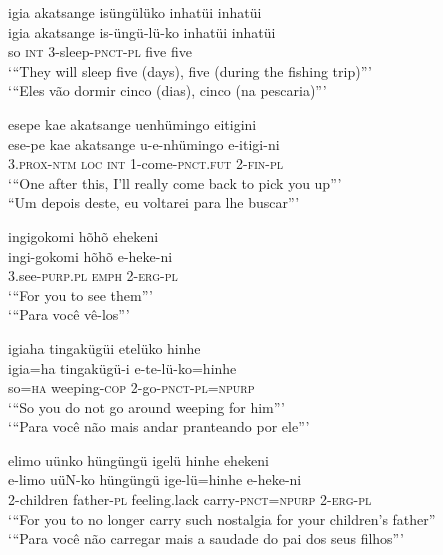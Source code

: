 \documentclass[output=paper,
modfonts,nonflat
]{langsci/langscibook}
\begin{document}
\ea igia akatsange isüngülüko inhatüi inhatüi \\[.3em]
\gll igia	akatsange	is-üngü-lü-ko		inhatüi	inhatüi \\
so	\textsc{int} 		3-sleep-\textsc{pnct-pl} 	five 		five \\
\glt ‘“They will sleep five (days), five (during the fishing trip)”’ \\
‘“Eles vão dormir cinco (dias), cinco (na pescaria)”’ \\
\z

\ea esepe kae akatsange uenhümingo eitigini \\[.3em]
\gll ese-pe		kae	akatsange	u-e-nhümingo		e-itigi-ni \\
3.\textsc{prox-ntm}	\textsc{loc} 	\textsc{int}		1-come-\textsc{pnct.fut} 	2-\textsc{fin-pl} \\
\glt ‘“One after this, I’ll really come back to pick you up”’ \\
“Um depois deste, eu voltarei para lhe buscar”’ \\
\z

\ea ingigokomi hõhõ ehekeni \\[.3em]
\gll ingi-gokomi	hõhõ	e-heke-ni \\
3.see-\textsc{purp.pl} 	\textsc{emph}	2-\textsc{erg-pl} \\
\glt ‘“For you to see them”’ \\
‘“Para você vê-los”’ \\
\z

\ea igiaha tingakügüi etelüko hinhe \\[.3em]
\gll igia=ha		tingakügü-i	e-te-lü-ko=hinhe \\
so=\textsc{ha} 		weeping-\textsc{cop} 	2-go-\textsc{pnct-pl=npurp} \\
\glt ‘“So you do not go around weeping for him”’ \\
‘“Para você não mais andar pranteando por ele”’ \\
\z

\ea elimo uünko hüngüngü igelü hinhe ehekeni \\[.3em]
\gll e-limo		uüN-ko	hüngüngü	ige-lü=hinhe		e-heke-ni \\
2-children	father-\textsc{pl}	feeling.lack 	carry-\textsc{pnct=npurp} 	2-\textsc{erg-pl} \\
\glt ‘“For you to no longer carry such nostalgia for your children’s father” \\
‘“Para você não carregar mais a saudade do pai dos seus filhos”’ \\
\z
\end{document}
